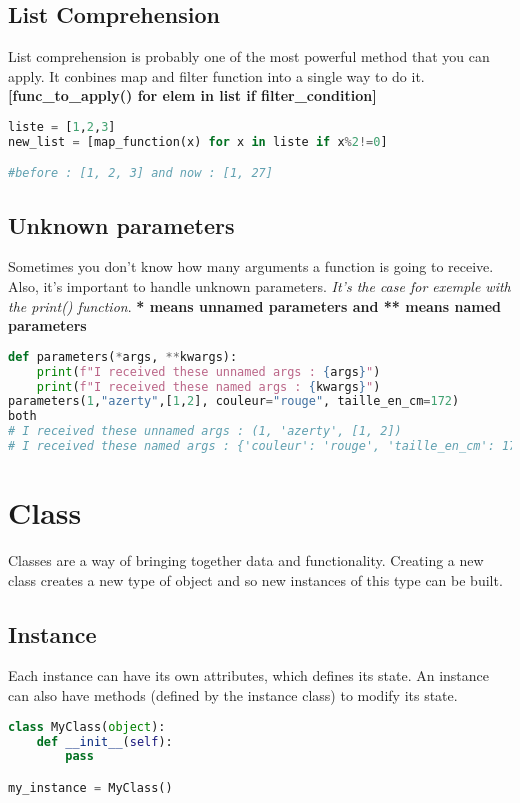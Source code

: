 \documentclass[a4paper, 12pt]{article}
\begin{document}
\subsection{List Comprehension}
List comprehension is probably one of the most powerful method that you can apply. It conbines map and filter function into a single way to do it. \textbf{[func\_to\_apply() for elem in list if filter\_condition]}
\label{subsec:ListComprehension}
\begin{lstlisting}[language=Python]
liste = [1,2,3]
new_list = [map_function(x) for x in liste if x%2!=0]

#before : [1, 2, 3] and now : [1, 27]
\end{lstlisting}

\subsection{Unknown parameters}
Sometimes you don't know how many arguments a function is going to receive. Also, it's important to handle unknown parameters. \textit{It's the case for exemple with the print() function}. \textbf{* means unnamed parameters and ** means named parameters}
\begin{lstlisting}[language=Python]
def parameters(*args, **kwargs):
	print(f"I received these unnamed args : {args}")
	print(f"I received these named args : {kwargs}")
parameters(1,"azerty",[1,2], couleur="rouge", taille_en_cm=172)
both
# I received these unnamed args : (1, 'azerty', [1, 2])
# I received these named args : {'couleur': 'rouge', 'taille_en_cm': 172}
\end{lstlisting}

\newpage
\section{Class}
\label{sec:Class}
Classes are a way of bringing together data and functionality. Creating a new class creates a new type of object and so new instances of this type can be built.\newline

\subsection{Instance}
Each instance can have its own attributes, which defines its state. An instance can also have methods (defined by the instance class) to modify its state.
\begin{lstlisting}[language=Python]
class MyClass(object):
	def __init__(self):
		pass

my_instance = MyClass()
\end{lstlisting}
\end{document}
